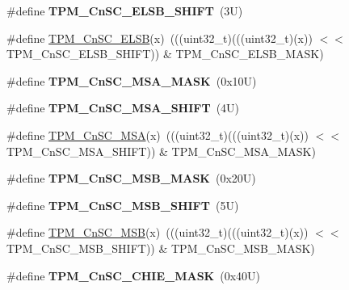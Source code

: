 \begin{DoxyCompactItemize}
\#define {\bfseries T\+P\+M\+\_\+\+Cn\+S\+C\+\_\+\+E\+L\+S\+B\+\_\+\+S\+H\+I\+FT}~(3\+U)
\item 
\#define \mbox{\hyperlink{group___t_p_m___register___masks_ga0ec35197ba98b3c0a4a42691646f0fd7}{T\+P\+M\+\_\+\+Cn\+S\+C\+\_\+\+E\+L\+SB}}(x)~(((uint32\+\_\+t)(((uint32\+\_\+t)(x)) $<$$<$ T\+P\+M\+\_\+\+Cn\+S\+C\+\_\+\+E\+L\+S\+B\+\_\+\+S\+H\+I\+FT)) \& T\+P\+M\+\_\+\+Cn\+S\+C\+\_\+\+E\+L\+S\+B\+\_\+\+M\+A\+SK)
\item 
\mbox{\label{group___t_p_m___register___masks_ga1701b53531ba658b0a237329ee8e223d}} 
\#define {\bfseries T\+P\+M\+\_\+\+Cn\+S\+C\+\_\+\+M\+S\+A\+\_\+\+M\+A\+SK}~(0x10\+U)
\item 
\mbox{\label{group___t_p_m___register___masks_ga1fdd989e2e0ec651c5e31641dde8f3ab}} 
\#define {\bfseries T\+P\+M\+\_\+\+Cn\+S\+C\+\_\+\+M\+S\+A\+\_\+\+S\+H\+I\+FT}~(4\+U)
\item 
\#define \mbox{\hyperlink{group___t_p_m___register___masks_ga347134863250a8610dcbd5cc89c4679a}{T\+P\+M\+\_\+\+Cn\+S\+C\+\_\+\+M\+SA}}(x)~(((uint32\+\_\+t)(((uint32\+\_\+t)(x)) $<$$<$ T\+P\+M\+\_\+\+Cn\+S\+C\+\_\+\+M\+S\+A\+\_\+\+S\+H\+I\+FT)) \& T\+P\+M\+\_\+\+Cn\+S\+C\+\_\+\+M\+S\+A\+\_\+\+M\+A\+SK)
\item 
\mbox{\label{group___t_p_m___register___masks_gadcd7434cb96e2f7ea230e9007fc1d438}} 
\#define {\bfseries T\+P\+M\+\_\+\+Cn\+S\+C\+\_\+\+M\+S\+B\+\_\+\+M\+A\+SK}~(0x20\+U)
\item 
\mbox{\label{group___t_p_m___register___masks_gaaac3c867927ac54cedc020da041c890d}} 
\#define {\bfseries T\+P\+M\+\_\+\+Cn\+S\+C\+\_\+\+M\+S\+B\+\_\+\+S\+H\+I\+FT}~(5\+U)
\item 
\#define \mbox{\hyperlink{group___t_p_m___register___masks_ga3ca2e73c81bd6a05ded83a2ed9d2bfb0}{T\+P\+M\+\_\+\+Cn\+S\+C\+\_\+\+M\+SB}}(x)~(((uint32\+\_\+t)(((uint32\+\_\+t)(x)) $<$$<$ T\+P\+M\+\_\+\+Cn\+S\+C\+\_\+\+M\+S\+B\+\_\+\+S\+H\+I\+FT)) \& T\+P\+M\+\_\+\+Cn\+S\+C\+\_\+\+M\+S\+B\+\_\+\+M\+A\+SK)
\item 
\mbox{\label{group___t_p_m___register___masks_ga10d745a2f031a572b8d871ac2d6199a8}} 
\#define {\bfseries T\+P\+M\+\_\+\+Cn\+S\+C\+\_\+\+C\+H\+I\+E\+\_\+\+M\+A\+SK}~(0x40\+U)
$$
\end{DoxyCompactItemize}
